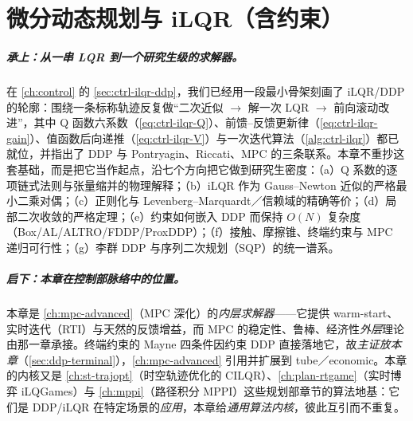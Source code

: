 \chapter{微分动态规划与 iLQR（含约束）}
\label{ch:ddp-ilqr}


\paragraph{承上：从一串 LQR 到一个研究生级的求解器。}
在 \cref{ch:control} 的 \cref{sec:ctrl-ilqr-ddp}，我们已经用一段最小骨架刻画了 iLQR/DDP 的轮廓：围绕一条标称轨迹反复做“二次近似 $\to$ 解一次 LQR $\to$ 前向滚动改进”，其中 Q 函数六系数（\cref{eq:ctrl-ilqr-Q}）、前馈--反馈更新律（\cref{eq:ctrl-ilqr-gain}）、值函数后向递推（\cref{eq:ctrl-ilqr-V}）与一次迭代算法（\cref{alg:ctrl-ilqr}）都已就位，并指出了 DDP 与 Pontryagin、Riccati、MPC 的三条联系。本章不重抄这套基础，而是把它当作起点，沿七个方向把它做到研究生密度：（a）Q 系数的逐项链式法则与张量缩并的物理解释；（b）iLQR 作为 Gauss--Newton 近似的严格最小二乘对偶；（c）正则化与 Levenberg--Marquardt／信赖域的精确等价；（d）局部二次收敛的严格定理；（e）约束如何嵌入 DDP 而保持 $O(N)$ 复杂度（Box/AL/ALTRO/FDDP/ProxDDP）；（f）接触、摩擦锥、终端约束与 MPC 递归可行性；（g）李群 DDP 与序列二次规划（SQP）的统一谱系。

\paragraph{启下：本章在控制部脉络中的位置。}
本章是 \cref{ch:mpc-advanced}（MPC 深化）的\emph{内层求解器}——它提供 warm-start、实时迭代（RTI）与天然的反馈增益，而 MPC 的稳定性、鲁棒、经济性\emph{外层}理论由那一章承接。终端约束的 Mayne 四条件因约束 DDP 直接落地它，故\emph{主证放本章}（\cref{sec:ddp-terminal}），\cref{ch:mpc-advanced} 引用并扩展到 tube／economic。本章的内核又是 \cref{ch:st-trajopt}（时空轨迹优化的 CILQR）、\cref{ch:plan-rtgame}（实时博弈 iLQGames）与 \cref{ch:mppi}（路径积分 MPPI）这些规划部章节的算法地基：它们是 DDP/iLQR 在特定场景的\emph{应用}，本章给\emph{通用算法内核}，彼此互引而不重复。

